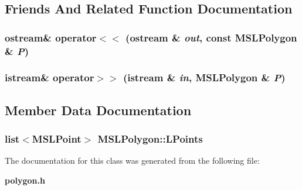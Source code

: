 \subsection{Friends And Related Function Documentation}
\subsubsection{\setlength{\rightskip}{0pt plus 5cm}ostream\& operator$<$$<$ (ostream \& {\em out}, const MSLPolygon \& {\em P})\hspace{0.3cm}{\tt  [friend]}}\label{classMSLPolygon_l1}


\subsubsection{\setlength{\rightskip}{0pt plus 5cm}istream\& operator$>$$>$ (istream \& {\em in}, MSLPolygon \& {\em P})\hspace{0.3cm}{\tt  [friend]}}\label{classMSLPolygon_l0}




\subsection{Member Data Documentation}
\subsubsection{\setlength{\rightskip}{0pt plus 5cm}list$<${\bf MSLPoint}$>$ MSLPolygon::LPoints}\label{classMSLPolygon_m0}




The documentation for this class was generated from the following file:\begin{CompactItemize}
\item 
{\bf polygon.h}\end{CompactItemize}
